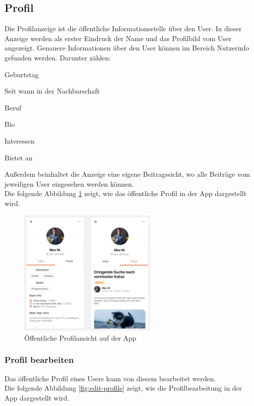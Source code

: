\subsection{Profil}
Die Profilanzeige ist die öffentliche Informationsstelle über den User. In dieser Anzeige werden als erster Eindruck der Name und das Profilbild vom User angezeigt. Genauere Informationen über den User können im Bereich Nutzerinfo gefunden werden. Darunter zählen:
\begin{compactitem}
  \item Geburtstag
  \item Seit wann in der Nachbarschaft
  \item Beruf
  \item Bio
  \item Interessen
  \item Bietet an
\end{compactitem}
Außerdem beinhaltet die Anzeige eine eigene Beitragssicht, wo alle Beiträge vom jeweiligen User eingesehen werden können.
\\
Die folgende Abbildung \ref{fig:public-profile} zeigt, wie das öffentliche Profil in der App dargestellt wird.

\begin{figure}[H]
  \centering
  \includegraphics[width=0.6\textwidth]{pics/public-profile.JPG}
  \caption{Öffentliche Profilansicht auf der App}
  \label{fig:public-profile}
\end{figure}


\subsubsection{Profil bearbeiten}

Das öffentliche Profil eines Users kann von diesem bearbeitet werden.
\\
Die folgende Abbildung \ref{fig:edit-profile} zeigt, wie die Profilbearbeitung in der App dargestellt wird.


